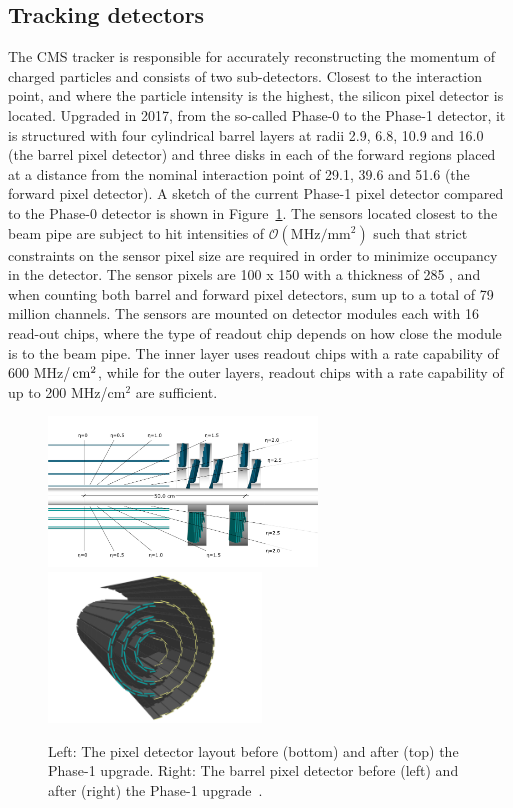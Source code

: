 \subsection{Tracking detectors}
The CMS tracker is responsible for accurately reconstructing the momentum of charged particles and consists of two sub-detectors. Closest to the interaction point, and where the particle intensity is the highest, the silicon pixel detector is located. Upgraded in 2017, from the so-called Phase-0 to the Phase-1 detector, it is structured with four cylindrical barrel layers at radii 2.9, 6.8, 10.9 and 16.0 \cm (the barrel pixel detector) and three disks in each of the forward regions placed at a distance from the nominal interaction point of 29.1, 39.6 and 51.6 \cm (the forward pixel detector). A sketch of the current Phase-1 pixel detector compared to the Phase-0 detector is shown in Figure~\ref{fig:cms:pixel}. The sensors located closest to the beam pipe are subject to hit intensities of $\mathcal{O}( \textrm{MHz}/\textrm{mm}^2 )$ such that strict constraints on the sensor pixel size are required in order to minimize occupancy in the detector. The sensor pixels are 100 \micron x 150 \micron with a thickness of 285 \micron, and when counting both barrel and forward pixel detectors, sum up to a total of 79 million channels. The sensors are mounted on detector modules each with 16 read-out chips, where the type of readout chip depends on how close the module is to the beam pipe. The inner layer uses readout chips with a rate capability of 600 MHz/$\,\text{cm}^2$, while for the outer layers, readout chips with a rate capability of up to 200 MHz/$\textrm{cm}^2$ are sufficient.
\begin{figure}[h] 
    \centering  
    \includegraphics[height=4cm,keepaspectratio]{figures/cms/20120828_01_pixel_phase1_largesharp.png}
    \includegraphics[height=4cm,keepaspectratio]{figures/cms/20120827_01_pixel_phase1_04.png}
    \caption{Left: The pixel detector layout before (bottom) and after (top) the Phase-1 upgrade. Right: The barrel pixel detector before (left) and after (right) the Phase-1 upgrade~\cite{Dominguez:1481838}.}
    \label{fig:cms:pixel}
\end{figure}

